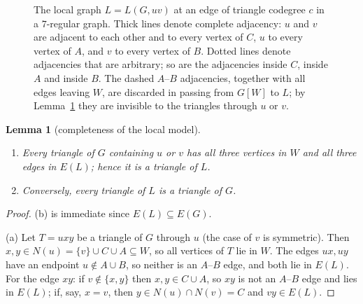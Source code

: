 \documentclass[11pt,a4paper]{amsart}
\theoremstyle{plain}
\newtheorem{lemma}[theorem]{Lemma}
\theoremstyle{definition}
\newcommand{\N}{N}
\begin{document}
\begin{figure}[t]
\centering
{}
\caption{The local graph $L=L(G,uv)$ at an edge of triangle codegree $c$ in a
$7$-regular graph. Thick lines denote complete adjacency: $u$ and $v$ are
adjacent to each other and to every vertex of $C$, $u$ to every vertex of $A$,
and $v$ to every vertex of $B$. Dotted lines denote adjacencies that are
arbitrary; so are the adjacencies inside $C$, inside $A$ and inside $B$. The
dashed $A$--$B$ adjacencies, together with all edges leaving $W$, are discarded
in passing from $G[W]$ to $L$; by Lemma~\ref{lem:localcomplete} they are
invisible to the triangles through $u$ or $v$.}
\label{fig:local}
\end{figure}

\begin{lemma}[completeness of the local model]\label{lem:localcomplete}
\begin{enumerate}
  \item[(a)] Every triangle of $G$ containing $u$ or $v$ has all three
    vertices in $W$ and all three edges in $E(L)$; hence it is a triangle
    of $L$.
  \item[(b)] Conversely, every triangle of $L$ is a triangle of $G$.
\end{enumerate}
\end{lemma}

\begin{proof}
(b) is immediate since $E(L)\subseteq E(G)$.

(a) Let $T=uxy$ be a triangle of $G$ through $u$ (the case of $v$ is
symmetric). Then $x,y\in \N(u)=\{v\}\cup C\cup A\subseteq W$, so all vertices
of $T$ lie in $W$. The edges $ux,uy$ have an endpoint $u\notin A\cup B$, so
neither is an $A$--$B$ edge, and both lie in $E(L)$. For the edge $xy$: if
$v\notin\{x,y\}$ then $x,y\in C\cup A$, so $xy$ is not an $A$--$B$ edge and
lies in $E(L)$; if, say, $x=v$, then $y\in \N(u)\cap \N(v)=C$ and $vy\in E(L)$.
\end{proof}
\end{document}
